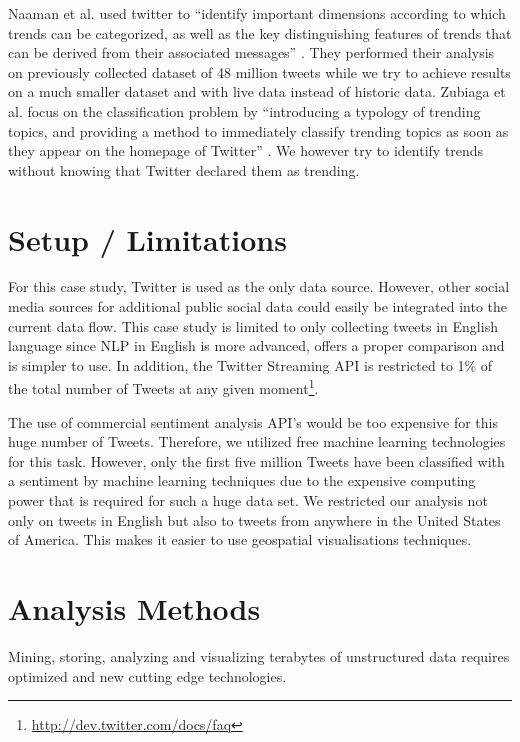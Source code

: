 Naaman et al. used twitter to \enquote{identify important dimensions according to which trends can be categorized, as well as the key distinguishing features of trends that can be derived from their associated messages} \cite{naaman2011characterizing}. They performed their analysis on previously collected dataset of 48 million tweets while we try to achieve results on a much smaller dataset and with live data instead of historic data. Zubiaga et al. focus on the classification problem by \enquote{introducing a typology of trending topics, and providing a method to immediately classify trending topics as soon as they  appear  on  the  homepage  of  Twitter} \cite{zubiaga2011classifications}. We however try to identify trends without knowing that Twitter declared them as trending.



\section{Setup / Limitations}
\label{sec:setup}
For this case study, Twitter is used as the only data source. However, other social media sources for additional public social data could easily be integrated into the current data flow. This case study is limited to only collecting tweets in English language since NLP in English is more advanced, offers a proper comparison and is simpler to use. In addition, the Twitter Streaming API is restricted to 1\% of the total number of Tweets at any given moment\footnote{\url{http://dev.twitter.com/docs/faq} \accessednote}.

The use of commercial sentiment analysis API's would be too expensive for this huge number of Tweets. Therefore, we utilized free machine learning technologies for this task. However, only the first five million Tweets have been classified with a sentiment by machine learning techniques due to the expensive computing power that is required for such a huge data set. We restricted our analysis not only on tweets in English but also to tweets from anywhere in the United States of America. This makes it easier to use geospatial visualisations techniques.


\section{Analysis Methods}
\label{sec:technologies}
Mining, storing, analyzing and visualizing terabytes of unstructured data requires optimized and new cutting edge technologies. 

